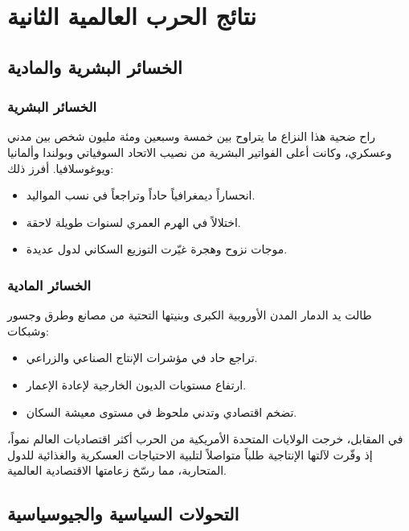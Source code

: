 \documentclass[12pt, a4paper]{article}
\begin{document}
\section{نتائج الحرب العالمية الثانية}

\subsection{الخسائر البشرية والمادية}

\subsubsection{الخسائر البشرية}
راح ضحية هذا النزاع ما يتراوح بين خمسة وسبعين ومئة مليون شخص بين مدني وعسكري،
وكانت أعلى الفواتير البشرية من نصيب الاتحاد السوفياتي وبولندا وألمانيا ويوغوسلافيا.
أفرز ذلك:
\begin{itemize}[leftmargin=*, itemsep=2pt]
  \item انحساراً ديمغرافياً حاداً وتراجعاً في نسب المواليد.
  \item اختلالاً في الهرم العمري لسنوات طويلة لاحقة.
  \item موجات نزوح وهجرة غيّرت التوزيع السكاني لدول عديدة.
\end{itemize}

\subsubsection{الخسائر المادية}
طالت يد الدمار المدن الأوروبية الكبرى وبنيتها التحتية من مصانع وطرق وجسور وشبكات:
\begin{itemize}[leftmargin=*, itemsep=2pt]
  \item تراجع حاد في مؤشرات الإنتاج الصناعي والزراعي.
  \item ارتفاع مستويات الديون الخارجية لإعادة الإعمار.
  \item تضخم اقتصادي وتدني ملحوظ في مستوى معيشة السكان.
\end{itemize}

في المقابل، خرجت الولايات المتحدة الأمريكية من الحرب أكثر اقتصاديات العالم نمواً،
إذ وفّرت لآلتها الإنتاجية طلباً متواصلاً لتلبية الاحتياجات العسكرية والغذائية
للدول المتحاربة، مما رسّخ زعامتها الاقتصادية العالمية.

\subsection{التحولات السياسية والجيوسياسية}
\end{document}
